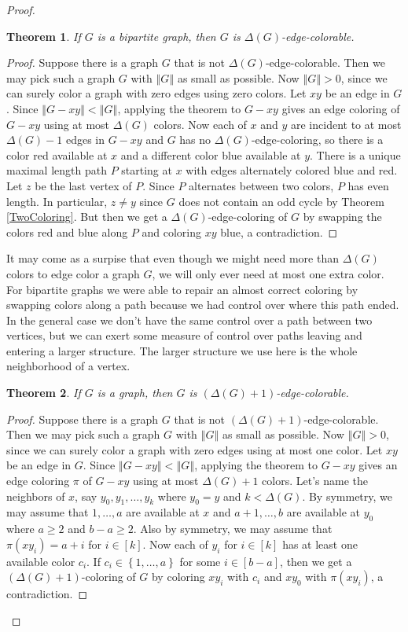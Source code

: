 \documentclass{amsbook}
\theoremstyle{plain}
\newtheorem{theorem}{Theorem}
\numberwithin{equation}{chapter}
\newcommand{\set}[1]{\left\{ #1 \right\}}
\newcommand{\size}[1]{\left\Vert#1\right\Vert}
\newcommand{\irange}[1]{\left[#1\right]}
\newcommand{\parens}[1]{\left( #1 \right)}
\begin{document}
\begin{proof}
\begin{theorem}\label{DeltaEdgeColoring}
If $G$ is a bipartite graph, then $G$ is $\Delta(G)$-edge-colorable.
\end{theorem}
\begin{proof}
Suppose there is a graph $G$ that is not $\Delta(G)$-edge-colorable.  Then we may pick such a graph $G$ with $\size{G}$ as small as possible.
Now $\size{G} > 0$, since we can surely color a graph with zero edges using zero colors.  Let $xy$ be an edge in $G$.  Since $\size{G-xy} < \size{G}$,
applying the theorem to $G-xy$ gives an edge coloring of $G-xy$ using at most $\Delta(G)$ colors.  Now each of $x$ and $y$ are incident to at most $\Delta(G) - 1$ edges
in $G-xy$ and $G$ has no $\Delta(G)$-edge-coloring, so there is a color red available at $x$ and a different color blue available at $y$.  There is a unique maximal length
path $P$ starting at $x$ with edges alternately colored blue and red. Let $z$ be the last vertex of $P$.  Since $P$ alternates between two colors, $P$ has even length.
In particular, $z \ne y$ since $G$ does not contain an odd cycle by Theorem \ref{TwoColoring}.  But then we get a $\Delta(G)$-edge-coloring of $G$ by swapping the colors red and blue 
along $P$ and coloring $xy$ blue, a contradiction.
\end{proof}

It may come as a surpise that even though we might need more than $\Delta(G)$ colors to edge color a graph $G$, we will only ever need at most one extra color.
For bipartite graphs we were able to repair an almost correct coloring by swapping colors along a path because we had control over where this path ended.  In the
general case we don't have the same control over a path between two vertices, but we can exert some measure of control over paths leaving and entering a larger structure. 
The larger structure we use here is the whole neighborhood of a vertex.

\begin{theorem}
If $G$ is a graph, then $G$ is $\parens{\Delta(G) + 1}$-edge-colorable.
\end{theorem}
\begin{proof}
Suppose there is a graph $G$ that is not $(\Delta(G) + 1)$-edge-colorable.  Then we may pick such a graph $G$ with $\size{G}$ as small as possible.
Now $\size{G} > 0$, since we can surely color a graph with zero edges using at most one color. Let $xy$ be an edge in $G$.  Since $\size{G-xy} < \size{G}$,
applying the theorem to $G-xy$ gives an edge coloring $\pi$ of $G-xy$ using at most $\Delta(G) + 1$ colors.  Let's name the neighbors of $x$, say $y_0, y_1, \ldots, y_k$ where
$y_0 = y$ and $k < \Delta(G)$.  By symmetry, we may assume that $1, \ldots, a$ are available at $x$ and $a+1, \ldots, b$ are available at $y_0$ where $a \ge 2$ and $b-a \ge 2$.
Also by symmetry, we may assume that $\pi(xy_i) = a + i$ for $i \in \irange{k}$. Now each of $y_i$ for $i \in \irange{k}$ has at least one available color $c_i$.  If $c_i \in \set{1,\ldots, a}$ for some $i \in \irange{b-a}$, then we get a $(\Delta(G)+1)$-coloring of 
$G$ by coloring $xy_i$ with $c_i$ and $xy_0$ with $\pi(xy_i)$, a contradiction.  


\end{proof}
\end{proof}
\end{document}
